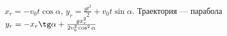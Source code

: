 $x_{r}=-v_{0}t\cos\alpha$, $y_{r}=\frac{gt^2}{2}+v_{0}t\sin\alpha$. 
Траектория --- парабола
$y_{r}=-x_{r}\tg\alpha+\frac{gx^2_{r}}{2v^2_{0}\cos^2\alpha}$


